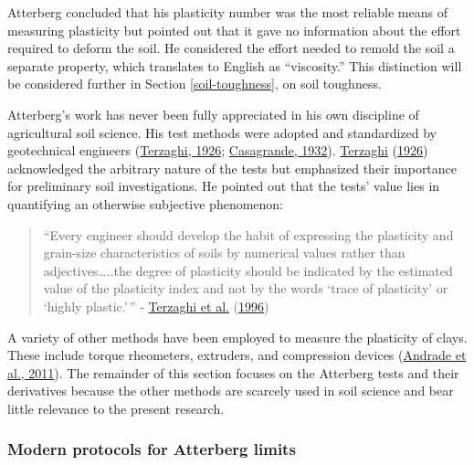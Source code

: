 \documentclass[
  letterpaper,
  openany]{book}
\renewenvironment{leftbar}{\def\FrameCommand{\color{grey30}\vrule width 1pt \hspace{10pt}}\MakeFramed {\advance\hsize-\width \FrameRestore}}{\endMakeFramed}
\renewenvironment{quote}%
{\begin{leftbar} \begin{quotation} \noindent \small }%
{\end{quotation}\end{leftbar}}
\begin{document}
Atterberg concluded that his plasticity number was the most reliable means of measuring plasticity but pointed out that it gave no information about the effort required to deform the soil.
He considered the effort needed to remold the soil a separate property, which translates to English as ``viscosity.'' This distinction will be considered further in Section \ref{soil-toughness}, on soil toughness.

Atterberg's work has never been fully appreciated in his own discipline of agricultural soil science. His test methods were adopted and standardized by geotechnical engineers (\protect\hyperlink{ref-Terzaghi1926}{Terzaghi, 1926}; \protect\hyperlink{ref-Casagrande1932}{Casagrande, 1932}).
\protect\hyperlink{ref-Terzaghi1926}{Terzaghi} (\protect\hyperlink{ref-Terzaghi1926}{1926}) acknowledged the arbitrary nature of the tests but emphasized their importance for preliminary soil investigations.
He pointed out that the tests' value lies in quantifying an otherwise subjective phenomenon:

\begin{quote}
``Every engineer should develop the habit of expressing the plasticity and grain-size characteristics of soils by numerical values rather than adjectives\ldots..the degree of plasticity should be indicated by the estimated value of the plasticity index and not by the words `trace of plasticity' or `highly plastic.'\,'' - \protect\hyperlink{ref-Terzaghi1996}{Terzaghi et al.} (\protect\hyperlink{ref-Terzaghi1996}{1996})
\end{quote}

A variety of other methods have been employed to measure the plasticity of clays.
These include torque rheometers, extruders, and compression devices (\protect\hyperlink{ref-Andrade2011}{Andrade et al., 2011}).
The remainder of this section focuses on the Atterberg tests and their derivatives because the other methods are scarcely used in soil science and bear little relevance to the present research.

\hypertarget{modern-protocols-for-atterberg-limits}{%
\subsubsection{Modern protocols for Atterberg limits}\label{modern-protocols-for-atterberg-limits}}
\end{document}
